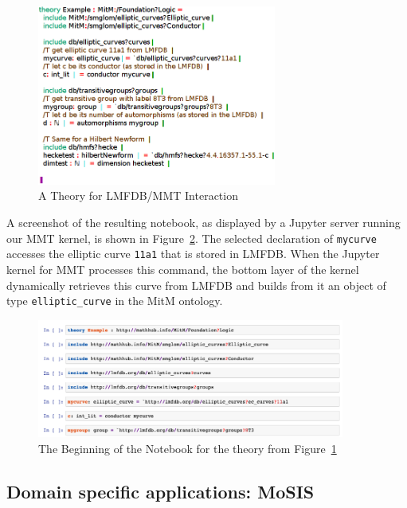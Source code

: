 \begin{figure}
  \includegraphics[width=0.7\textwidth]{../D4.11/hecke}
  \caption{A Theory for LMFDB/MMT Interaction}\label{fig:hecke}
\end{figure}
A screenshot of the resulting notebook, as displayed by a Jupyter server running our MMT kernel, is shown in Figure~\ref{fig:lmfdbexample}.
The selected declaration of \texttt{mycurve} accesses the elliptic curve \texttt{11a1} that is stored in LMFDB.
When the Jupyter kernel for MMT processes this command, the bottom layer of the kernel dynamically retrieves this curve from LMFDB and builds from it an object of type \texttt{elliptic\_curve} in the MitM ontology.

\begin{figure}[ht]\centering
  \includegraphics[width=0.9\textwidth]{screenshots/heckenb}
  \caption{The Beginning of the Notebook for the theory from Figure~\ref{fig:hecke}}\label{fig:lmfdbexample}
\end{figure}

\subsection{Domain specific applications: MoSIS}

